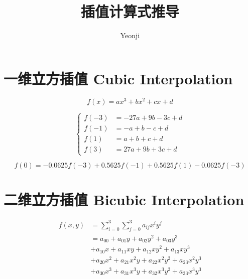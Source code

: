 \documentclass[12pt,a4paper]{article}
\title{插值计算式推导}
\author{Yeonji}
\begin{document}
\maketitle

\section{一维立方插值 Cubic Interpolation}

\begin{equation}
f(x) = ax^3 + bx^2 + cx + d
\end{equation}


\begin{equation}
\left\{
\begin{aligned}
f(-3) &= -27a + 9b -3c + d\\
f(-1) &= -a + b - c + d\\
f(1) &= a + b + c + d\\
f(3) &= 27a + 9b + 3c + d
\end{aligned}
\right.
\end{equation}

\begin{equation}
f(0) = -0.0625f(-3) + 0.5625f(-1) + 0.5625f(1) -0.0625f(-3)
\end{equation}

\section{二维立方插值 Bicubic Interpolation}

\begin{equation}
\begin{aligned}
f(x,y) &= \sum_{i=0}^3 \sum_{j=0}^3 a_{ij} x^i y^j\\
&= a_{00} + a_{01}y + a_{02}y^2 + a_{03}y^3\\
&+ a_{10}x + a_{11}xy + a_{12}xy^2 + a_{13}xy^3\\
&+ a_{20}x^2 + a_{21}x^2y + a_{22}x^2y^2 + a_{23}x^2y^3\\
&+ a_{30}x^3 + a_{31}x^3y + a_{32}x^3y^2 + a_{33}x^3y^3\\
\end{aligned}
\end{equation}
\end{document}
